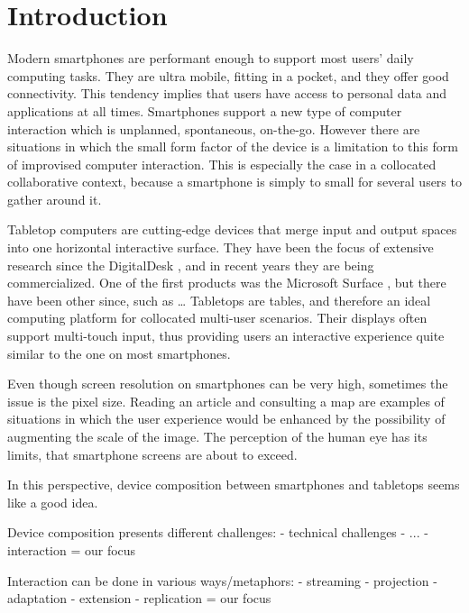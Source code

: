 

%

\chapter{Introduction}

Modern smartphones are performant enough to support most users' daily computing tasks.
They are ultra mobile, fitting in a pocket, and they offer good connectivity.
This tendency implies that users have access to personal data and applications at all times.
Smartphones support a new type of computer interaction which is unplanned, spontaneous, on-the-go.
However there are situations in which the small form factor of the device is a limitation to this form of improvised computer interaction.
This is especially the case in a collocated collaborative context, because a smartphone is simply to small for several users to gather around it.

Tabletop computers are cutting-edge devices that merge input and output spaces into one horizontal interactive surface.
They have been the focus of extensive research since the DigitalDesk \citep{Wellner:1993:digitaldesk}, and in recent years they are being commercialized.
One of the first products was the Microsoft Surface \citep{ms}, but there have been other since, such as \ldots
Tabletops are tables, and therefore an ideal computing platform for collocated multi-user scenarios.
Their displays often support multi-touch input, thus providing users an interactive  experience quite similar to the one on most smartphones.

Even though screen resolution on smartphones can be very high, sometimes the issue is the pixel size.
Reading an article and consulting a map are examples of situations in which the user experience would be enhanced by the possibility of augmenting the scale of the image.
The perception of the human eye has its limits, that smartphone screens are about to exceed.

In this perspective, device composition between smartphones and tabletops seems like a good idea.

Device composition presents different challenges:
- technical challenges
- ...
- interaction = our focus

Interaction can be done in various ways/metaphors:
- streaming
- projection
- adaptation
- extension
- replication = our focus

